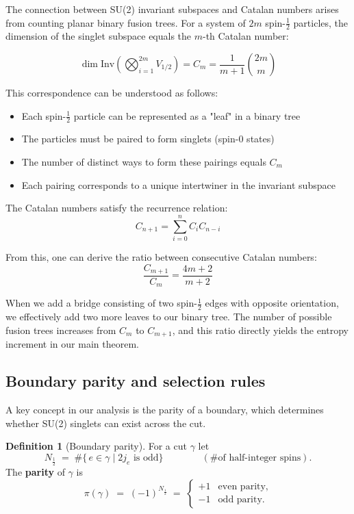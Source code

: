 \documentclass[11pt, a4paper]{article}
\theoremstyle{plain}
\theoremstyle{definition}
\newtheorem{definition}[theorem]{Definition}
\theoremstyle{remark}
\newcommand{\Inv}{\mathrm{Inv}}
\begin{document}
The connection between SU(2) invariant subspaces and Catalan numbers arises from counting planar binary fusion trees. For a system of $2m$ spin-$\frac{1}{2}$ particles, the dimension of the singlet subspace equals the $m$-th Catalan number:

\begin{equation}
\dim\Inv\left(\bigotimes_{i=1}^{2m} V_{1/2}\right) = C_m = \frac{1}{m+1}\binom{2m}{m}
\end{equation}

This correspondence can be understood as follows:
\begin{itemize}
\item Each spin-$\frac{1}{2}$ particle can be represented as a "leaf" in a binary tree
\item The particles must be paired to form singlets (spin-0 states)
\item The number of distinct ways to form these pairings equals $C_m$
\item Each pairing corresponds to a unique intertwiner in the invariant subspace
\end{itemize}

The Catalan numbers satisfy the recurrence relation:
\begin{equation}
C_{n+1} = \sum_{i=0}^{n} C_i C_{n-i}
\end{equation}

From this, one can derive the ratio between consecutive Catalan numbers:
\begin{equation}
\frac{C_{m+1}}{C_m} = \frac{4m+2}{m+2}
\end{equation}

When we add a bridge consisting of two spin-$\frac{1}{2}$ edges with opposite orientation, we effectively add two more leaves to our binary tree. The number of possible fusion trees increases from $C_m$ to $C_{m+1}$, and this ratio directly yields the entropy increment in our main theorem.

\subsection{Boundary parity and selection rules}
\label{sec:parity}

A key concept in our analysis is the parity of a boundary, which determines whether SU(2) singlets can exist across the cut.

\begin{definition}[Boundary parity]
\label{def:parity}
For a cut $\gamma$ let
\[  N_{\tfrac12} \;=\;\#\{\,e\in\gamma \mid 2j_e\text{ is odd}\}\qquad\qquad(\text{\# of half-integer spins}) .\]
The \textbf{parity} of $\gamma$ is
\[  \pi(\gamma)\;=\;(-1)^{N_{\tfrac12}}  \;=\;  \begin{cases}     +1 &\text{even parity,}\\     -1 &\text{odd parity.}  \end{cases}\]
\end{definition}
\end{document}
